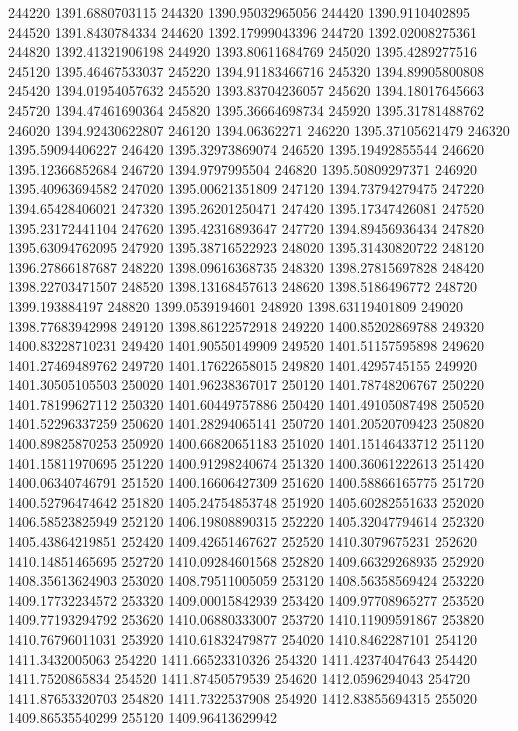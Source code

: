 {244220 1391.6880703115
244320 1390.95032965056
244420 1390.9110402895
244520 1391.8430784334
244620 1392.17999043396
244720 1392.02008275361
244820 1392.41321906198
244920 1393.80611684769
245020 1395.4289277516
245120 1395.46467533037
245220 1394.91183466716
245320 1394.89905800808
245420 1394.01954057632
245520 1393.83704236057
245620 1394.18017645663
245720 1394.47461690364
245820 1395.36664698734
245920 1395.31781488762
246020 1394.92430622807
246120 1394.06362271
246220 1395.37105621479
246320 1395.59094406227
246420 1395.32973869074
246520 1395.19492855544
246620 1395.12366852684
246720 1394.9797995504
246820 1395.50809297371
246920 1395.40963694582
247020 1395.00621351809
247120 1394.73794279475
247220 1394.65428406021
247320 1395.26201250471
247420 1395.17347426081
247520 1395.23172441104
247620 1395.42316893647
247720 1394.89456936434
247820 1395.63094762095
247920 1395.38716522923
248020 1395.31430820722
248120 1396.27866187687
248220 1398.09616368735
248320 1398.27815697828
248420 1398.22703471507
248520 1398.13168457613
248620 1398.5186496772
248720 1399.193884197
248820 1399.0539194601
248920 1398.63119401809
249020 1398.77683942998
249120 1398.86122572918
249220 1400.85202869788
249320 1400.83228710231
249420 1401.90550149909
249520 1401.51157595898
249620 1401.27469489762
249720 1401.17622658015
249820 1401.4295745155
249920 1401.30505105503
250020 1401.96238367017
250120 1401.78748206767
250220 1401.78199627112
250320 1401.60449757886
250420 1401.49105087498
250520 1401.52296337259
250620 1401.28294065141
250720 1401.20520709423
250820 1400.89825870253
250920 1400.66820651183
251020 1401.15146433712
251120 1401.15811970695
251220 1400.91298240674
251320 1400.36061222613
251420 1400.06340746791
251520 1400.16606427309
251620 1400.58866165775
251720 1400.52796474642
251820 1405.24754853748
251920 1405.60282551633
252020 1406.58523825949
252120 1406.19808890315
252220 1405.32047794614
252320 1405.43864219851
252420 1409.42651467627
252520 1410.3079675231
252620 1410.14851465695
252720 1410.09284601568
252820 1409.66329268935
252920 1408.35613624903
253020 1408.79511005059
253120 1408.56358569424
253220 1409.17732234572
253320 1409.00015842939
253420 1409.97708965277
253520 1409.77193294792
253620 1410.06880333007
253720 1410.11909591867
253820 1410.76796011031
253920 1410.61832479877
254020 1410.8462287101
254120 1411.3432005063
254220 1411.66523310326
254320 1411.42374047643
254420 1411.7520865834
254520 1411.87450579539
254620 1412.0596294043
254720 1411.87653320703
254820 1411.7322537908
254920 1412.83855694315
255020 1409.86535540299
255120 1409.96413629942
}
